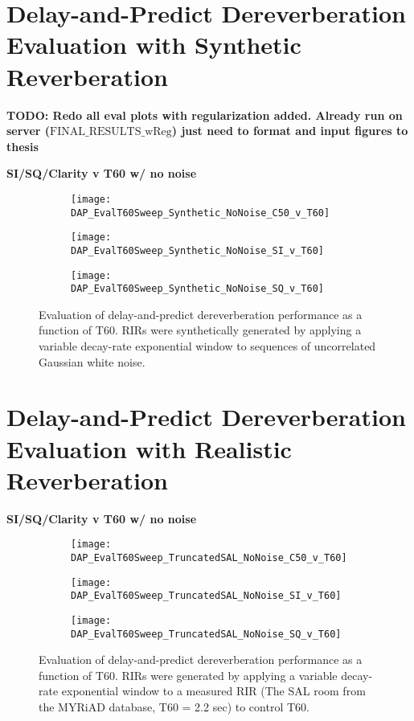 \section{Delay-and-Predict Dereverberation Evaluation with Synthetic Reverberation}

\textbf{TODO: Redo all eval plots with regularization added. Already run on server ($\text{FINAL}\_\text{RESULTS}\_\text{wReg}$) just need to format and input figures to thesis}

\textbf{SI/SQ/Clarity v T60 w/ no noise}

\begin{figure}[H]
	\centering
	\begin{subfigure}[b]{0.47\textwidth}
		\centering
		\texttt{[image: DAP\_EvalT60Sweep\_Synthetic\_NoNoise\_C50\_v\_T60]}
	\end{subfigure}
	\begin{subfigure}[b]{0.92\textwidth}
		\centering
		\texttt{[image: DAP\_EvalT60Sweep\_Synthetic\_NoNoise\_SI\_v\_T60]}
	\end{subfigure}
	\begin{subfigure}[b]{0.92\textwidth}
		\centering
		\texttt{[image: DAP\_EvalT60Sweep\_Synthetic\_NoNoise\_SQ\_v\_T60]}
	\end{subfigure}
	\caption{Evaluation of delay-and-predict dereverberation performance as a function of T60. RIRs were synthetically generated by applying a variable decay-rate exponential window to sequences of uncorrelated Gaussian white noise.}
	\label{fig:DAP_EvalT60Sweep_Synthetic_NoNoise}
\end{figure}

\section{Delay-and-Predict Dereverberation Evaluation with Realistic Reverberation}

\textbf{SI/SQ/Clarity v T60 w/ no noise}

\begin{figure}[H]
	\centering
	\begin{subfigure}[b]{0.47\textwidth}
		\centering
		\texttt{[image: DAP\_EvalT60Sweep\_TruncatedSAL\_NoNoise\_C50\_v\_T60]}
	\end{subfigure}
	\begin{subfigure}[b]{0.92\textwidth}
		\centering
		\texttt{[image: DAP\_EvalT60Sweep\_TruncatedSAL\_NoNoise\_SI\_v\_T60]}
	\end{subfigure}
	\begin{subfigure}[b]{0.92\textwidth}
		\centering
		\texttt{[image: DAP\_EvalT60Sweep\_TruncatedSAL\_NoNoise\_SQ\_v\_T60]}
	\end{subfigure}
	\caption{Evaluation of delay-and-predict dereverberation performance as a function of T60. RIRs were generated by applying a variable decay-rate exponential window to a measured RIR (The SAL room from the MYRiAD database, T60 = 2.2 sec) to control T60.}
	\label{fig:DAP_EvalT60Sweep_TruncatedSAL_NoNoise}
\end{figure}


